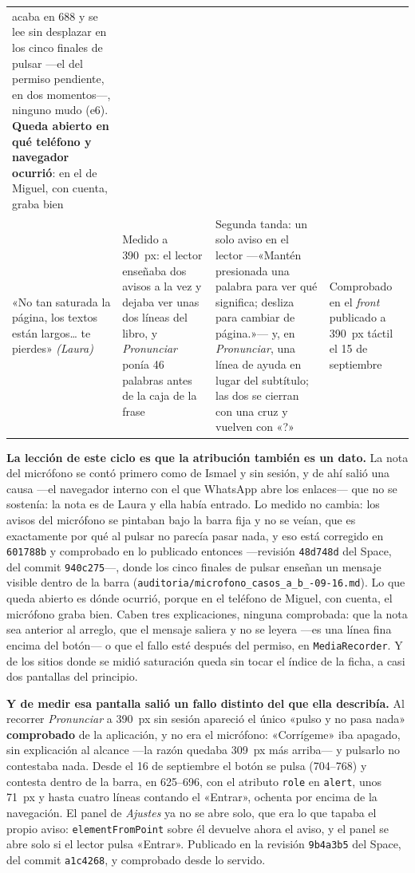 \documentclass[11pt,a4paper]{article}
\newcommand{\cod}[1]{\texttt{\small #1}}
\begin{document}
\begin{small}
\begin{longtable}{@{}L{3.1cm} L{3.8cm} L{4.2cm} L{2.8cm}@{}}
acaba en 688 y se lee sin desplazar en los cinco finales de pulsar ---el del permiso
pendiente, en dos momentos---, ninguno mudo (e6).
\textbf{Queda abierto en qué teléfono y navegador ocurrió}: en el de Miguel, con cuenta,
graba bien \\
\addlinespace
«No tan saturada la página, los textos están largos\dots{} te pierdes»
\emph{(Laura)} & Medido a 390~px:
el lector enseñaba dos avisos a la vez y dejaba ver unas dos líneas del libro, y
\emph{Pronunciar} ponía 46 palabras antes de la caja de la frase & Segunda tanda: un solo
aviso en el lector —«Mantén presionada una palabra para ver qué significa; desliza para
cambiar de página.»— y, en \emph{Pronunciar}, una línea de ayuda en lugar del subtítulo;
las dos se cierran con una cruz y vuelven con «?» & Comprobado en el \emph{front}
publicado a 390~px táctil el 15 de septiembre \\
\end{longtable}
\end{small}

\textbf{La lección de este ciclo es que la atribución también es un dato.} La nota del
micrófono se contó primero como de Ismael y sin sesión, y de ahí salió una causa ---el
navegador interno con el que WhatsApp abre los enlaces--- que no se sostenía: la nota es de
Laura y ella había entrado. Lo medido no cambia: los avisos del micrófono se pintaban bajo
la barra fija y no se veían, que es exactamente por qué al pulsar no parecía pasar nada, y
eso está corregido en \cod{601788b} y comprobado en lo publicado entonces ---revisión
\cod{48d748d} del Space, del commit \cod{940c275}---, donde los cinco finales de
pulsar enseñan un mensaje visible dentro de la barra
(\cod{auditoria/\allowbreak microfono\_casos\_a\_b\_\allowbreak 2026-09-16.md}). Lo que queda
abierto es dónde ocurrió, porque en el teléfono de Miguel, con cuenta, el micrófono graba
bien. Caben tres explicaciones, ninguna comprobada: que la nota sea anterior al arreglo, que
el mensaje saliera y no se leyera ---es una línea fina encima del botón--- o que el fallo
esté después del permiso, en \cod{MediaRecorder}. Y de los sitios donde se midió saturación
queda sin tocar el índice de la ficha, a casi dos pantallas del principio.

\textbf{Y de medir esa pantalla salió un fallo distinto del que ella describía.} Al
recorrer \emph{Pronunciar} a 390~px sin sesión apareció el único «pulso y no pasa nada»
\textbf{comprobado} de la aplicación, y no era el micrófono: «Corrígeme» iba apagado, sin
explicación al alcance ---la razón quedaba 309~px más arriba--- y pulsarlo no contestaba
nada. Desde el 16 de septiembre el botón se pulsa (704--768) y contesta dentro de la barra,
en 625--696, con el atributo \cod{role} en \cod{alert}, unos 71~px y hasta cuatro líneas contando el «Entrar»,
ochenta por encima de la navegación. El panel de \emph{Ajustes} ya no se abre solo, que era
lo que tapaba el propio aviso: \cod{elementFromPoint} sobre él devuelve ahora el aviso, y el
panel se abre solo si el lector pulsa «Entrar». Publicado en la revisión \cod{9b4a3b5} del
Space, del commit \cod{a1c4268}, y comprobado desde lo servido.
\end{document}
